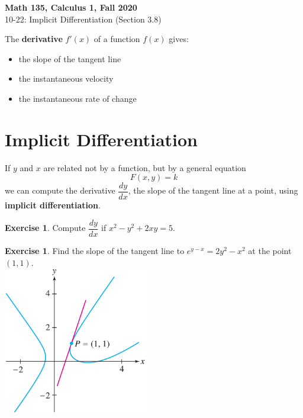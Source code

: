 \documentclass[11pt,reqno,final]{amsart}
\numberwithin{figure}{section}
\theoremstyle{definition} %
\newtheorem{exercise}[question]{Exercise}
\begin{document}
\begin{center}
        \textbf{\Large Math 135, Calculus 1, Fall 2020}\\[10pt]
        {\large 10-22: Implicit Differentiation (Section 3.8)}
\end{center}

\thispagestyle{empty}


\renewcommand{\thesection}{\Alph{section}}


The \textbf{derivative} $f'(x)$ of a function $f(x)$ gives:
\begin{itemize}
\item the slope of the tangent line
\item the instantaneous velocity
\item the instantaneous rate of change
\end{itemize}


\section{Implicit Differentiation}

If $y$ and $x$ are related not by a function, but by a general equation
\[
        F(x,y) = k
\]
we can compute the derivative $\dfrac{dy}{dx}$, the slope of the tangent line at a point, using \textbf{implicit differentiation}.

\begin{exercise}
        Compute $\dfrac{dy}{dx}$ if $x^2 - y^2 + 2xy = 5$.
        \vfill
\end{exercise}

\begin{exercise}
        Find the slope of the tangent line to $e^{y-x} = 2y^2 - x^2$ at the point $(1,1)$.\\
        \includegraphics[width=2.5in]{10-26P_graph1.png}
        \vfill
\end{exercise}
\end{document}
